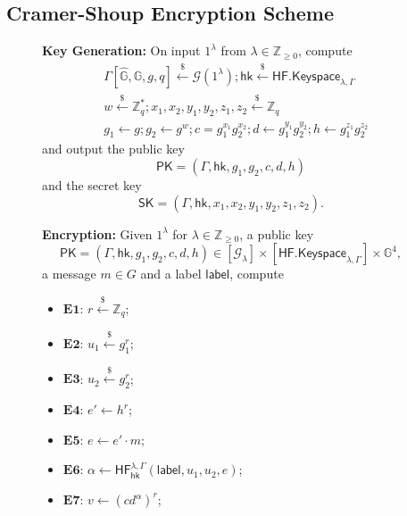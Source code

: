\documentclass[10pt,a4paper]{article}
\newcommand{\SK}{\mathsf{SK}}
\newcommand{\PK}{\mathsf{PK}}
\newcommand{\rgets}{\xleftarrow{\$}}
\newcommand{\G}{\mathbb{G}}
\newcommand{\hk}{\mathsf{hk}}
\newcommand{\lab}{\mathsf{label}}
\newcommand{\estep}[1]{\mathbf{E#1}}
\begin{document}
	
	
	\subsection{Cramer-Shoup Encryption Scheme}
	
	\begin{figure}[ht!]
		\begin{framed}
			
			\vspace{2mm}
			\textbf{Key Generation:} On input $1^\lambda$ from $\lambda\in\mathbb{Z}_{\geq 0}$, compute
			\begin{align*}
				&\Gamma[\hat{\mathbb{G}}, \mathbb{G}, g, q]\rgets\mathcal{G}(1^\lambda); \hk\rgets\mathsf{HF.Keyspace}_{\lambda,\Gamma}\\
				&w\rgets\mathbb{Z}_q^{*}; x_1,x_2,y_1,y_2,z_1,z_2\rgets\mathbb{Z}_q\\
				&g_1\gets g; g_2\gets g^{w}; c = g_1^{x_1}g_2^{x_2}; d\gets g_1^{y_1}g_2^{y_2}; h\gets g_1^{z_1}g_2^{z_2}
			\end{align*}
			and output the public key $$\PK = (\Gamma,\hk,g_1,g_2,c,d,h)$$ and the secret key $$\SK = (\Gamma, \hk, x_1,x_2,y_1,y_2,z_1,z_2).$$
			
			\vspace{4mm}
			
			\textbf{Encryption:} Given $1^\lambda$ for $\lambda\in\mathbb{Z}_{\geq 0}$, a public key $$\PK=(\Gamma,\hk,g_1,g_2,c,d,h)\in[\mathcal{G}_\lambda]\times[\mathsf{HF.Keyspace}_{\lambda,\Gamma}]\times\G^4,$$ a message $m\in G$ and a label $\lab$, compute\\
			
			\begin{itemize}
				\item[]\textbf{$\estep{1}$}: $r\rgets\mathbb{Z}_q$;
				\item[]\textbf{$\estep{2}$}: $u_1\rgets g_1^r$;
				\item[]\textbf{$\estep{3}$}: $u_2\rgets g_2^r$;
				\item[]\textbf{$\estep{4}$}: $e'\gets h^r$;
				\item[]\textbf{$\estep{5}$}: $e\gets e'\cdot m$;
				\item[]\textbf{$\estep{6}$}: $\alpha\gets\mathsf{HF}^{\lambda,\Gamma}_{\hk}(\lab, u_1, u_2, e)$;
				\item[]\textbf{$\estep{7}$}: $v\gets (cd^\alpha)^r$;\\
			\end{itemize}
		

\end{framed}
\end{figure}
\end{document}
